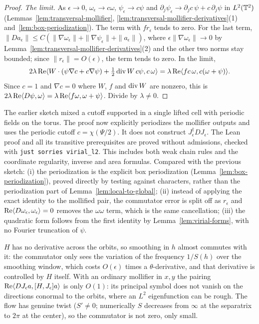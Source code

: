 \begin{proof}
\emph{The limit.} As $\epsilon\to0$, $\omega_\epsilon\to c\omega$, $\psi_\epsilon\to c\psi$
and $\partial_j\psi_\epsilon\to\partial_jc\,\psi+c\,\partial_j\psi$ in $L^2(\mathbb{T}^2)$
(Lemmas~\ref{lem:transversal-mollifier}, \ref{lem:transversal-mollifier-derivatives}(1)
and~\ref{lem:box-periodization}). The term with $fr_\epsilon$ tends to zero. For the last
term, $\|Da_\epsilon\|\le C(\|\nabla\omega_\epsilon\|+\|\nabla\psi_\epsilon\|+\|a_\epsilon\|)$,
where $\epsilon\|\nabla\omega_\epsilon\|\to0$ by
Lemma~\ref{lem:transversal-mollifier-derivatives}(2) and the other two norms stay bounded;
since $\|r_\epsilon\|=O(\epsilon)$, the term tends to zero. In the limit,
\[
  2\lambda\operatorname{Re}\langle W\cdot(\psi\nabla c+c\nabla\psi)+\tfrac12\operatorname{div} W\,c\psi,c\,\omega\rangle
  =\lambda\operatorname{Re}\langle fc\,\omega,c(\omega+\psi)\rangle.
\]
Since $c=1$ and $\nabla c=0$ where $W$, $f$ and $\operatorname{div} W$ are nonzero, this is
$2\lambda\operatorname{Re}\langle D\psi,\omega\rangle=\lambda\operatorname{Re}\langle f\omega,\omega+\psi\rangle$.
Divide by $\lambda\ne0$.
\end{proof}

\begin{remark}
The earlier sketch mixed a cutoff supported in a single lifted cell with
periodic fields on the torus. The proof now explicitly periodizes the
mollifier outputs and uses the periodic cutoff $c=\chi(\Psi/2)$.
It does not construct $J_\epsilon^\dagger DJ_\epsilon$.
The Lean proof and all its transitive prerequisites are proved without
admissions, checked with \texttt{just sorries virial\_l2}. This includes both
weak chain rules and the coordinate regularity, inverse and area formulas. Compared with
the previous sketch: (i) the periodization is the explicit box periodization
(Lemma~\ref{lem:box-periodization}), proved directly by testing against characters, rather
than the periodization part of Lemma~\ref{lem:local-to-global}; (ii) instead of applying
the exact identity to the mollified pair, the commutator error is split off as $r_\epsilon$
and $\operatorname{Re}\langle D\omega_\epsilon,\omega_\epsilon\rangle=0$ removes the $\omega\omega$
term, which is the same cancellation; (iii) the quadratic form follows from the first
identity by Lemma~\ref{lem:virial-forms}, with no Fourier truncation of $\psi$.
\end{remark}

\begin{remark}
$H$ has no derivative across the orbits, so smoothing in $h$ almost commutes with it: the
commutator only sees the variation of the frequency $1/S(h)$ over the smoothing window,
which costs $O(\epsilon)$ times a $\theta$-derivative, and that derivative is controlled by
$H$ itself. With an ordinary mollifier in $x,y$ the pairing
$\operatorname{Re}\langle DJ_\epsilon a,[H,J_\epsilon]a\rangle$ is only $O(1)$: its principal symbol does
not vanish on the directions conormal to the orbits, where an $L^2$ eigenfunction can be
rough. The flow has genuine twist ($S'\ne0$; numerically $S$ decreases from $\infty$ at the
separatrix to $2\pi$ at the center), so the commutator is not zero, only small.
\end{remark}

